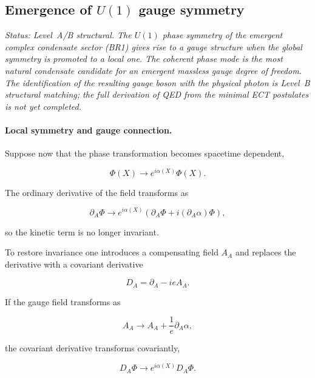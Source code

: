 \documentclass[11pt,a4paper]{article}
\numberwithin{equation}{section}
\begin{document}
\subsection{Emergence of $U(1)$ gauge symmetry}

\textit{Status: Level~A/B structural.  The $U(1)$ phase symmetry
of the emergent complex condensate sector (BR1) gives rise to a
gauge structure when the global symmetry is promoted to a local one.
The coherent phase mode is the most natural condensate candidate for
an emergent massless gauge degree of freedom.
The identification of the resulting gauge boson with the physical photon
is Level~B structural matching; the full derivation of QED from the
minimal ECT postulates is not yet completed.}

\paragraph{Local symmetry and gauge connection.}

Suppose now that the phase transformation becomes spacetime dependent,

\begin{equation}
\Phi(X) \rightarrow e^{i\alpha(X)}\Phi(X).
\end{equation}

The ordinary derivative of the field transforms as

\begin{equation}
\partial_A \Phi \rightarrow
e^{i\alpha(X)}\left(\partial_A \Phi
+ i(\partial_A\alpha)\Phi\right),
\end{equation}

so the kinetic term is no longer invariant.

To restore invariance one introduces a compensating field $A_A$ and
replaces the derivative with a covariant derivative

\begin{equation}
D_A = \partial_A - i e A_A .
\end{equation}

If the gauge field transforms as

\begin{equation}
A_A \rightarrow A_A + \frac{1}{e}\partial_A\alpha ,
\end{equation}

the covariant derivative transforms covariantly,

\begin{equation}
D_A \Phi \rightarrow e^{i\alpha(X)} D_A\Phi .
\end{equation}
\end{document}
